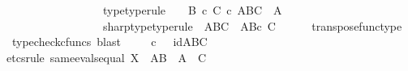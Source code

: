 \begin{isabellebody}
\ \ \ \ \ \ \ \ \ \ \ \ \ \ \ \ \ {\isasympsi}{\isacharunderscore}{\kern0pt}type{\isacharbrackleft}{\kern0pt}type{\isacharunderscore}{\kern0pt}rule{\isacharbrackright}{\kern0pt}{\isacharcolon}{\kern0pt}\ {\isachardoublequoteopen}{\isasympsi}\ {\isacharcolon}{\kern0pt}\ \ {\isacharparenleft}{\kern0pt}B\ {\isasymtimes}\isactrlsub c\ C{\isacharparenright}{\kern0pt}\ {\isasymtimes}\isactrlsub c\ {\isacharparenleft}{\kern0pt}{\isacharparenleft}{\kern0pt}A\isactrlbsup B\isactrlesup {\isacharparenright}{\kern0pt}\isactrlbsup C\isactrlesup {\isacharparenright}{\kern0pt}\ {\isasymrightarrow}\ A{\isachardoublequoteclose}\ \isanewline
\ \ \ \ \ \ \ \ \ \ \ \ \ \ \ \ \ {\isasympsi}sharp{\isacharunderscore}{\kern0pt}type{\isacharbrackleft}{\kern0pt}type{\isacharunderscore}{\kern0pt}rule{\isacharbrackright}{\kern0pt}{\isacharcolon}{\kern0pt}\ {\isachardoublequoteopen}{\isasympsi}\isactrlsup {\isasymsharp}{\isacharcolon}{\kern0pt}\ {\isacharparenleft}{\kern0pt}A\isactrlbsup B\isactrlesup {\isacharparenright}{\kern0pt}\isactrlbsup C\isactrlesup \ {\isasymrightarrow}\ {\isacharparenleft}{\kern0pt}A\isactrlbsup {\isacharparenleft}{\kern0pt}B{\isasymtimes}\isactrlsub c\ C{\isacharparenright}{\kern0pt}\isactrlesup {\isacharparenright}{\kern0pt}{\isachardoublequoteclose}\isanewline
\ \ \ \ \isamarkupfalse%
\ transpose{\isacharunderscore}{\kern0pt}func{\isacharunderscore}{\kern0pt}type\ \isamarkupfalse%
\ {\isacharparenleft}{\kern0pt}typecheck{\isacharunderscore}{\kern0pt}cfuncs{\isacharcomma}{\kern0pt}\ blast{\isacharparenright}{\kern0pt}\isanewline
\isanewline
\ \ \isamarkupfalse%
\ {\isachardoublequoteopen}{\isasymphi}\isactrlsup {\isasymsharp}\isactrlsup {\isasymsharp}\ {\isasymcirc}\isactrlsub c\ {\isasympsi}\isactrlsup {\isasymsharp}\ {\isacharequal}{\kern0pt}\ id{\isacharparenleft}{\kern0pt}{\isacharparenleft}{\kern0pt}A\isactrlbsup B\isactrlesup {\isacharparenright}{\kern0pt}\isactrlbsup C\isactrlesup {\isacharparenright}{\kern0pt}{\isachardoublequoteclose}\isanewline
\ \ \isamarkupfalse%
{\isacharparenleft}{\kern0pt}etcs{\isacharunderscore}{\kern0pt}rule\ same{\isacharunderscore}{\kern0pt}evals{\isacharunderscore}{\kern0pt}equal{\isacharbrackleft}{\kern0pt}\ X\ {\isacharequal}{\kern0pt}\ {\isachardoublequoteopen}{\isacharparenleft}{\kern0pt}A\isactrlbsup B\isactrlesup {\isacharparenright}{\kern0pt}{\isachardoublequoteclose}{\isacharcomma}{\kern0pt}\ \ A\ {\isacharequal}{\kern0pt}\ {\isachardoublequoteopen}C{\isachardoublequoteclose}{\isacharbrackright}{\kern0pt}{\isacharparenright}{\kern0pt}\isanewline

\end{isabellebody}
